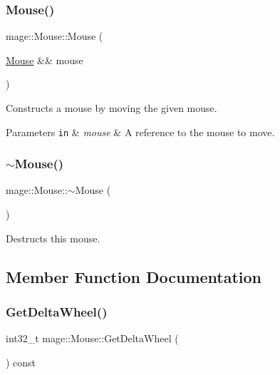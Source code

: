 \subsubsection{\texorpdfstring{Mouse()}{Mouse()}\hspace{0.1cm}{\footnotesize\ttfamily [3/3]}}
{\footnotesize\ttfamily mage\+::\+Mouse\+::\+Mouse (\begin{DoxyParamCaption}\item[{\hyperlink{classmage_1_1_mouse}{Mouse} \&\&}]{mouse }\end{DoxyParamCaption})\hspace{0.3cm}{\ttfamily [default]}}

Constructs a mouse by moving the given mouse.


\begin{DoxyParams}[1]{Parameters}
\mbox{\tt in}  & {\em mouse} & A reference to the mouse to move. \\
\hline
\end{DoxyParams}
\hypertarget{classmage_1_1_mouse_a29ed64ff53304fdb5c336264d702a4cf}{}\label{classmage_1_1_mouse_a29ed64ff53304fdb5c336264d702a4cf} 
\subsubsection{\texorpdfstring{$\sim$\+Mouse()}{~Mouse()}}
{\footnotesize\ttfamily mage\+::\+Mouse\+::$\sim$\+Mouse (\begin{DoxyParamCaption}{ }\end{DoxyParamCaption})\hspace{0.3cm}{\ttfamily [default]}}

Destructs this mouse. 

\subsection{Member Function Documentation}
\hypertarget{classmage_1_1_mouse_a241a67628ecb123f86fee484fd910807}{}\label{classmage_1_1_mouse_a241a67628ecb123f86fee484fd910807} 
\subsubsection{\texorpdfstring{Get\+Delta\+Wheel()}{GetDeltaWheel()}}
{\footnotesize\ttfamily int32\+\_\+t mage\+::\+Mouse\+::\+Get\+Delta\+Wheel (\begin{DoxyParamCaption}{ }\end{DoxyParamCaption}) const}

